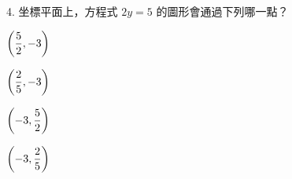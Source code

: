 \documentclass[12pt]{article}
\begin{document}
\begin{problem}
  \item[4.] 坐標平面上，方程式 $2y = 5$ 的圖形會通過下列哪一點？
  \begin{choices}
    \item $\biggl(\fraction{5}{2}, -3\biggr)$
    \item $\biggl(\fraction{2}{5}, -3\biggr)$
    \item $\biggl(-3, \fraction{5}{2}\biggr)$
    \item $\biggl(-3, \fraction{2}{5}\biggr)$
  \end{choices}
\end{problem}
\end{document}
